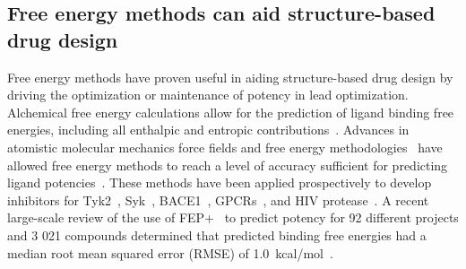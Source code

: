 \documentclass[phd,tocprelim]{cornell}
\begin{document}
\subsection{Free energy methods can aid structure-based drug design}
Free energy methods have proven useful in aiding structure-based drug design by driving the optimization or maintenance of potency in lead optimization. Alchemical free energy calculations allow for the prediction of ligand binding free energies, including all enthalpic and entropic contributions~\citep{Chodera2011-jn}. 
Advances in atomistic molecular mechanics force fields and free energy methodologies~\citep{Huang:J.Comput.Chem.:2013,Maier:J.Chem.TheoryComput.:2015,Harder:J.Chem.TheoryComput.:2016,Cournia:2017ip} have allowed free energy methods to reach a level of accuracy  sufficient for predicting ligand potencies~\citep{BROWN2009420}. 
These methods have been applied prospectively to develop inhibitors for Tyk2~\citep{Abel2017-gw}, Syk~\citep{Lovering:2016fg}, BACE1~\citep{Ciordia:2016dn}, GPCRs~\citep{Lenselink:2016ip}, and HIV protease~\citep{Jorgensen:2016dv}. 
A recent large-scale review of the use of FEP+~\citep{Wang:J.Am.Chem.Soc.:2015} to predict potency for 92 different projects and 3 021 compounds determined that predicted binding free energies had a median root mean squared error (RMSE) of 1.0~kcal/mol~\citep{Abel:2017jt}. 
\end{document}
